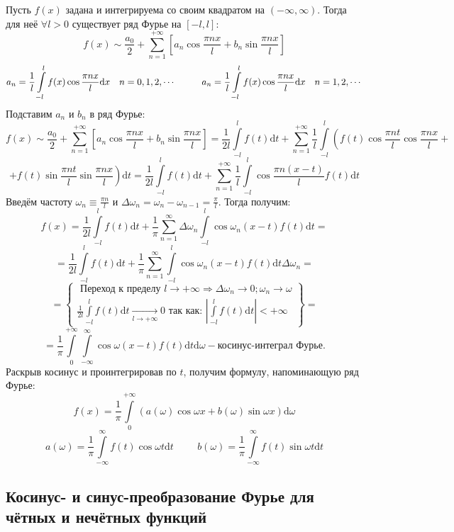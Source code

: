 \documentclass[12pt, a4paper]{article}
\newcommand{\di}{\mathrm{d}}
\begin{document}
Пусть $f(x)$ задана и интегрируема со своим квадратом на $(-\infty, \infty)$. Тогда для неё $\forall l > 0$ существует ряд Фурье на $[-l, l]$:
\[f(x) \sim \frac{a_0}{2} + \sum_{n=1}^{+\infty} \left[ a_n \cos \frac{\pi nx}{l} + b_n \sin \frac{\pi nx}{l} \right] \]
\[a_n = \frac{1}{l} \int \limits_{-l}^l f(x) \cos \frac{\pi nx}{l} \di x \quad n=0,1,2,\cdots \hspace{1 cm} a_n = \frac{1}{l} \int \limits_{-l}^l f(x) \cos \frac{\pi nx}{l} \di x \quad n=1,2,\cdots \]
Подставим $a_n$ и $b_n$ в ряд Фурье:
\[f(x) \sim \frac{a_0}{2} + \sum_{n=1}^{+\infty} \left[ a_n \cos \frac{\pi nx}{l} + b_n \sin \frac{\pi nx}{l} \right] = \frac{1}{2l} \int \limits_{-l}^l f(t) \di t + \sum_{n=1}^{+\infty} \frac{1}{l} \int \limits_{-l}^l \left( f(t) \cos \frac{\pi nt}{l} \cos \frac{\pi nx}{l} + \right. \]
\[\left. + f(t) \sin \frac{\pi nt}{l} \sin \frac{\pi nx}{l} \right) \di t = \frac{1}{2l} \int \limits_{-l}^l f(t) \di t + \sum_{n=1}^{+\infty} \frac{1}{l} \int \limits_{-l}^l \cos \frac{\pi n(x-t)}{l} f(t) \di t \]
Введём частоту $\omega_n \equiv \frac{\pi n}{l}$ и $\Delta \omega_n = \omega_n - \omega_{n-1} = \frac{\pi}{l}$. Тогда получим:
\[f(x) = \frac{1}{2l} \int \limits_{-l}^l f(t) \di t + \frac{1}{\pi} \sum_{n=1}^{\infty} \Delta \omega_n \int \limits_{-l}^l \cos \omega_n (x-t) f(t) \di t = \]
\[= \frac{1}{2l} \int \limits_{-l}^l f(t) \di t + \frac{1}{\pi} \sum_{n=1}^{\infty} \int \limits_{-l}^l \cos \omega_n (x-t) f(t) \di t \Delta \omega_n = \]
\[= \begin{Bmatrix} \textrm{ Переход к пределу } l \to +\infty \Rightarrow \Delta \omega_n \to 0; \omega_n \to \omega \\ \frac{1}{2l} \int \limits_{-l}^l f(t) \di t \xrightarrow[l \to +\infty]{} 0 \textrm{ так как: } \left| \int \limits_{-l}^l f(t) \di t \right| < +\infty \end{Bmatrix} = \]
\[= \frac{1}{\pi} \int \limits_0^{+\infty} \int \limits_{-\infty}^{\infty} \cos \omega (x-t) f(t) \di t \di \omega - \textbf{косинус-интеграл Фурье.} \]
Раскрыв косинус и проинтегрировав по $t$, получим формулу, напоминающую ряд Фурье:
\[f(x) = \frac{1}{\pi} \int \limits_0^{+\infty} (a(\omega) \cos \omega x + b(\omega) \sin \omega x) \di \omega \]
\[a(\omega) = \frac{1}{\pi} \int \limits_{-\infty}^{\infty} f(t) \cos \omega t \di t \hspace{1cm} b(\omega) = \frac{1}{\pi} \int \limits_{-\infty}^{\infty} f(t) \sin \omega t \di t \]

\subsection{Косинус- и синус-преобразование Фурье для чётных и нечётных функций}
\end{document}
